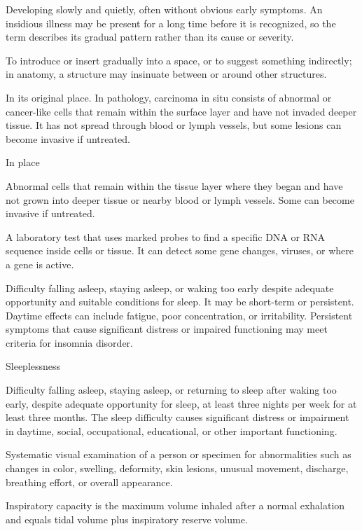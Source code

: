  Developing slowly and quietly, often without obvious early symptoms. An insidious illness may be present for a long time before it is recognized, so the term describes its gradual pattern rather than its cause or severity.

 To introduce or insert gradually into a space, or to suggest something indirectly; in anatomy, a structure may insinuate between or around other structures.

 In its original place. In pathology, carcinoma in situ consists of abnormal or cancer-like cells that remain within the surface layer and have not invaded deeper tissue. It has not spread through blood or lymph vessels, but some lesions can become invasive if untreated.

\synonyms
In place

 Abnormal cells that remain within the tissue layer where they began and have not grown into deeper tissue or nearby blood or lymph vessels. Some can become invasive if untreated.

 A laboratory test that uses marked probes to find a specific DNA or RNA sequence inside cells or tissue. It can detect some gene changes, viruses, or where a gene is active.

 Difficulty falling asleep, staying asleep, or waking too early despite adequate
opportunity and suitable conditions for sleep. It may be short-term or persistent. Daytime effects
can include fatigue, poor concentration, or irritability. Persistent symptoms that cause significant
distress or impaired functioning may meet criteria for insomnia disorder.

\synonyms
Sleeplessness

 Difficulty falling asleep, staying asleep, or returning to sleep after
waking too early, despite adequate opportunity for sleep, at least three nights per week for at
least three months. The sleep difficulty causes significant distress or impairment in daytime,
social, occupational, educational, or other important functioning.

 Systematic visual examination of a person or specimen for abnormalities such as changes in color, swelling, deformity, skin lesions, unusual movement, discharge, breathing effort, or overall appearance.

 Inspiratory capacity is the maximum volume inhaled after a normal exhalation and equals tidal volume plus inspiratory reserve volume.

